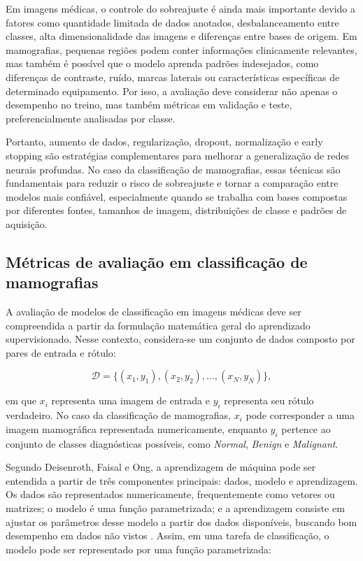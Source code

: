 \documentclass[
    12pt,
    openright,
    oneside,
    a4paper,
    english,
    brazil
]{abntex2}
\begin{document}
Em imagens médicas, o controle do sobreajuste é ainda mais importante devido a fatores como quantidade limitada de dados anotados, desbalanceamento entre classes, alta dimensionalidade das imagens e diferenças entre bases de origem. Em mamografias, pequenas regiões podem conter informações clinicamente relevantes, mas também é possível que o modelo aprenda padrões indesejados, como diferenças de contraste, ruído, marcas laterais ou características específicas de determinado equipamento. Por isso, a avaliação deve considerar não apenas o desempenho no treino, mas também métricas em validação e teste, preferencialmente analisadas por classe.

Portanto, aumento de dados, regularização, dropout, normalização e early stopping são estratégias complementares para melhorar a generalização de redes neurais profundas. No caso da classificação de mamografias, essas técnicas são fundamentais para reduzir o risco de sobreajuste e tornar a comparação entre modelos mais confiável, especialmente quando se trabalha com bases compostas por diferentes fontes, tamanhos de imagem, distribuições de classe e padrões de aquisição.

\subsection{Métricas de avaliação em classificação de mamografias}
\label{subsec:metricas_avaliacao}

A avaliação de modelos de classificação em imagens médicas deve ser compreendida a partir da formulação matemática geral do aprendizado supervisionado. Nesse contexto, considera-se um conjunto de dados composto por pares de entrada e rótulo:

\[
\mathcal{D} = \{(x_1,y_1),(x_2,y_2),\ldots,(x_N,y_N)\},
\]

em que \(x_i\) representa uma imagem de entrada e \(y_i\) representa seu rótulo verdadeiro. No caso da classificação de mamografias, \(x_i\) pode corresponder a uma imagem mamográfica representada numericamente, enquanto \(y_i\) pertence ao conjunto de classes diagnósticas possíveis, como \textit{Normal}, \textit{Benign} e \textit{Malignant}.

Segundo Deisenroth, Faisal e Ong, a aprendizagem de máquina pode ser entendida a partir de três componentes principais: dados, modelo e aprendizagem. Os dados são representados numericamente, frequentemente como vetores ou matrizes; o modelo é uma função parametrizada; e a aprendizagem consiste em ajustar os parâmetros desse modelo a partir dos dados disponíveis, buscando bom desempenho em dados não vistos \cite{deisenroth2020mathematics}. Assim, em uma tarefa de classificação, o modelo pode ser representado por uma função parametrizada:
\end{document}
